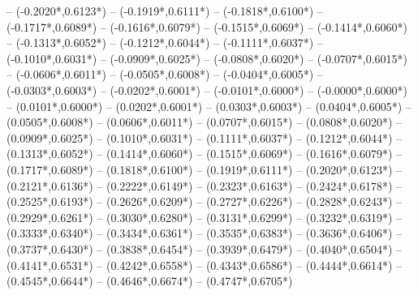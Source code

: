 {	-- ({-0.2020*\dx},{0.6123*\dy})
	-- ({-0.1919*\dx},{0.6111*\dy})
	-- ({-0.1818*\dx},{0.6100*\dy})
	-- ({-0.1717*\dx},{0.6089*\dy})
	-- ({-0.1616*\dx},{0.6079*\dy})
	-- ({-0.1515*\dx},{0.6069*\dy})
	-- ({-0.1414*\dx},{0.6060*\dy})
	-- ({-0.1313*\dx},{0.6052*\dy})
	-- ({-0.1212*\dx},{0.6044*\dy})
	-- ({-0.1111*\dx},{0.6037*\dy})
	-- ({-0.1010*\dx},{0.6031*\dy})
	-- ({-0.0909*\dx},{0.6025*\dy})
	-- ({-0.0808*\dx},{0.6020*\dy})
	-- ({-0.0707*\dx},{0.6015*\dy})
	-- ({-0.0606*\dx},{0.6011*\dy})
	-- ({-0.0505*\dx},{0.6008*\dy})
	-- ({-0.0404*\dx},{0.6005*\dy})
	-- ({-0.0303*\dx},{0.6003*\dy})
	-- ({-0.0202*\dx},{0.6001*\dy})
	-- ({-0.0101*\dx},{0.6000*\dy})
	-- ({-0.0000*\dx},{0.6000*\dy})
	-- ({0.0101*\dx},{0.6000*\dy}) %
	-- ({0.0202*\dx},{0.6001*\dy}) %
	-- ({0.0303*\dx},{0.6003*\dy}) %
	-- ({0.0404*\dx},{0.6005*\dy}) %
	-- ({0.0505*\dx},{0.6008*\dy}) %
	-- ({0.0606*\dx},{0.6011*\dy}) %
	-- ({0.0707*\dx},{0.6015*\dy}) %
	-- ({0.0808*\dx},{0.6020*\dy}) %
	-- ({0.0909*\dx},{0.6025*\dy}) %
	-- ({0.1010*\dx},{0.6031*\dy}) %
	-- ({0.1111*\dx},{0.6037*\dy}) %
	-- ({0.1212*\dx},{0.6044*\dy}) %
	-- ({0.1313*\dx},{0.6052*\dy}) %
	-- ({0.1414*\dx},{0.6060*\dy}) %
	-- ({0.1515*\dx},{0.6069*\dy}) %
	-- ({0.1616*\dx},{0.6079*\dy}) %
	-- ({0.1717*\dx},{0.6089*\dy}) %
	-- ({0.1818*\dx},{0.6100*\dy}) %
	-- ({0.1919*\dx},{0.6111*\dy}) %
	-- ({0.2020*\dx},{0.6123*\dy}) %
	-- ({0.2121*\dx},{0.6136*\dy}) %
	-- ({0.2222*\dx},{0.6149*\dy}) %
	-- ({0.2323*\dx},{0.6163*\dy}) %
	-- ({0.2424*\dx},{0.6178*\dy}) %
	-- ({0.2525*\dx},{0.6193*\dy}) %
	-- ({0.2626*\dx},{0.6209*\dy}) %
	-- ({0.2727*\dx},{0.6226*\dy}) %
	-- ({0.2828*\dx},{0.6243*\dy}) %
	-- ({0.2929*\dx},{0.6261*\dy}) %
	-- ({0.3030*\dx},{0.6280*\dy}) %
	-- ({0.3131*\dx},{0.6299*\dy}) %
	-- ({0.3232*\dx},{0.6319*\dy}) %
	-- ({0.3333*\dx},{0.6340*\dy}) %
	-- ({0.3434*\dx},{0.6361*\dy}) %
	-- ({0.3535*\dx},{0.6383*\dy}) %
	-- ({0.3636*\dx},{0.6406*\dy}) %
	-- ({0.3737*\dx},{0.6430*\dy}) %
	-- ({0.3838*\dx},{0.6454*\dy}) %
	-- ({0.3939*\dx},{0.6479*\dy}) %
	-- ({0.4040*\dx},{0.6504*\dy}) %
	-- ({0.4141*\dx},{0.6531*\dy}) %
	-- ({0.4242*\dx},{0.6558*\dy}) %
	-- ({0.4343*\dx},{0.6586*\dy}) %
	-- ({0.4444*\dx},{0.6614*\dy}) %
	-- ({0.4545*\dx},{0.6644*\dy}) %
	-- ({0.4646*\dx},{0.6674*\dy}) %
	-- ({0.4747*\dx},{0.6705*\dy}) %
}
